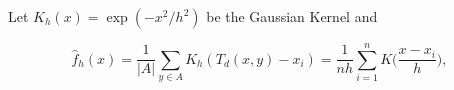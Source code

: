 Let  $K_h(x) = \exp( -x^2/h^2)$ be the Gaussian Kernel and

\[
    \hat{f}_h(x) = \frac{1}{|A|}\sum_{ y \in A} K_h (T_d(x,y) - x_i) = \frac{1}{nh} \sum_{i=1}^n K\Big(\frac{x-x_i}{h}\Big),
  \]